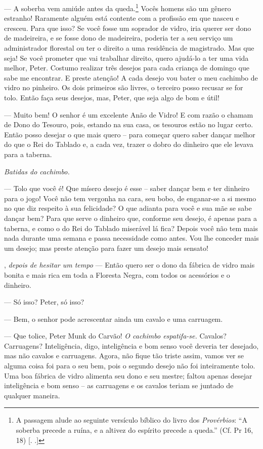 \begin{myparindent}{0pt}
\begin{Parskip}
 --- A soberba vem amiúde antes da queda.\footnote{A
  passagem alude ao seguinte versículo bíblico do livro dos
  \emph{Provérbios}: ``A soberba precede a ruína, e a altivez do
  espírito precede a queda.'' (Cf. Pr 16, 18) [. .]} Vocês
homens são um gênero estranho! Raramente alguém está contente com a
profissão em que nasceu e cresceu. Para que isso? Se você fosse um
soprador de vidro, iria querer ser dono de madeireira, e se fosse dono
de madeireira, poderia ter a seu serviço um administrador florestal ou
ter o direito a uma residência de magistrado. Mas que seja! Se você
prometer que vai trabalhar direito, quero ajudá-lo a ter uma vida
melhor, Peter. Costumo realizar três desejos para cada criança de
domingo que sabe me encontrar. E preste atenção! A cada desejo vou bater
o meu cachimbo de vidro no pinheiro. Os dois primeiros são livres, o
terceiro posso recusar se for tolo. Então faça seus desejos, mas, Peter,
que seja algo de bom e útil!

 --- Muito bem! O senhor é um excelente Anão de
Vidro! E com razão o chamam de Dono do Tesouro, pois, estando na sua
casa, os tesouros estão no lugar certo. Então posso desejar o que mais
quero -- para começar quero saber dançar melhor do que o Rei do Tablado
e, a cada vez, trazer o dobro do dinheiro que ele levava para a taberna.

\emph{Batidas do cachimbo.}

 --- Tolo que você é! Que mísero desejo é esse -- saber
dançar bem e ter dinheiro para o jogo! Você não tem vergonha na cara,
seu bobo, de enganar-se a si mesmo no que diz respeito à sua felicidade?
O que adianta para você e sua mãe se sabe dançar bem? Para que serve o
dinheiro que, conforme seu desejo, é apenas para a taberna, e como o do 
Rei do Tablado miserável lá fica?
Depois você não tem
mais nada durante uma semana e passa necessidade como antes. Vou lhe
conceder mais um desejo; mas preste atenção para fazer um desejo mais
sensato!

, \emph{depois de hesitar um tempo} --- Então quero
ser o dono da fábrica de vidro mais bonita e mais rica em toda a
Floresta Negra, com todos os acessórios e o dinheiro.

 --- Só isso? Peter, só isso?

 --- Bem, o senhor pode acrescentar ainda um cavalo e
uma carruagem.

 --- Que tolice, Peter Munk do Carvão! \emph{O cachimbo
espatifa-se.} Cavalos? Carruagens? Inteligência, digo, inteligência e
bom senso você deveria ter desejado, mas não cavalos e carruagens.
Agora, não fique tão triste assim, vamos ver se alguma coisa foi para o
seu bem, pois o segundo desejo não foi inteiramente tolo. Uma boa
fábrica de vidro alimenta seu dono e seu mestre; faltou apenas desejar
inteligência e bom senso -- as carruagens e os cavalos teriam se juntado
de qualquer maneira.


\end{Parskip}
\end{myparindent}
